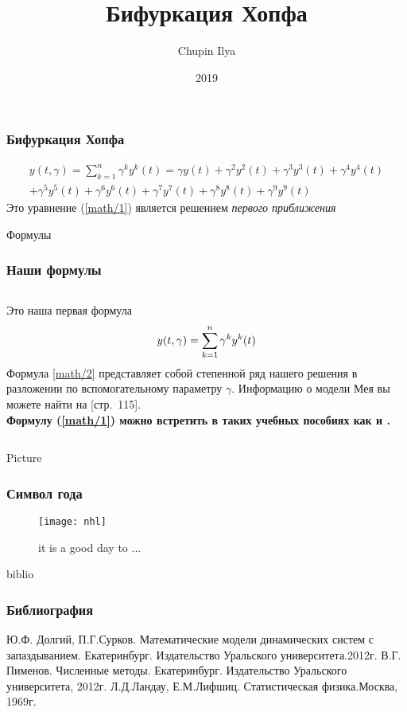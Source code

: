 \documentclass[12pt]{beamer}
\title{Бифуркация Хопфа}
\author{Chupin Ilya}
\institute{Ural Federal University}
\date{2019}
\begin{document}
\frame{\titlepage}
\begin{frame}
\frametitle{Бифуркация Хопфа}
 \begin{multline}
      y(t,\gamma)=\sum_{k=1}^n \gamma^k y^k (t)= \gamma y(t)+\gamma^2 y^2(t)+\gamma^3 y^3(t)+\gamma^4 y^4 (t)\\  + \gamma^5 y^5(t)+\gamma^6 y^6(t) +\gamma^7 y^7(t) +\gamma^8 y^8(t)+\gamma^9 y^9(t)
 \label{math/1}
  \end{multline}
Это уравнение (\ref{math/1}) является решением \emph{ первого приближения }
\end{frame}
\begin{frame}{Формулы}
    \frametitle{Наши формулы}
    \begin{columns}
   \small{ Это наша первая формула}\\
    \begin{multline}
    \small{  y(t,\gamma)=\sum_{k=1}^n \gamma^k y^k (t)}
 \label{math/2}
  \end{multline}
  Формула \ref{math/2} представляет собой степенной ряд нашего решения в разложении по вспомогательному параметру $\gamma $. Информацию о модели Мея вы можете найти на \cite{Dolgiy}[стр.~115].\\
\textbf{ Формулу (\ref{math/1}) можно встретить в таких учебных пособиях как \cite{Pimenov} и \cite{landau}.}
    \end{columns}
\end{frame}
\begin{frame}{Picture}
    \frametitle{Символ года}
    \begin{figure}
    \centering
    \texttt{[image: nhl]}
    \caption{it is a good day to ...}
    \label{picture1}
\end{figure}
\end{frame}
\begin{frame}{biblio}
    \frametitle{Библиография}
    \begin{thebibliography}{5}
    Ю.Ф. Долгий, П.Г.Сурков. Математические модели динамических систем с запаздыванием. Екатеринбург. Издательство Уральского университета.2012г.
    В.Г. Пименов. Численные методы. Екатеринбург. Издательство Уральского университета, 2012г.
    Л.Д.Ландау, Е.М.Лифшиц. Статистическая физика.Москва, 1969г.
    \end{thebibliography}
    \end{frame}
\end{document}
